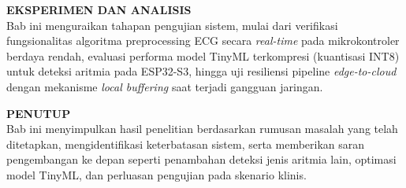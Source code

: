 \noindent
\textbf{EKSPERIMEN DAN ANALISIS}\\
\hspace*{1.5cm} Bab ini menguraikan tahapan pengujian sistem, mulai dari verifikasi fungsionalitas algoritma preprocessing ECG secara \textit{real-time} pada mikrokontroler berdaya rendah, evaluasi performa model TinyML terkompresi (kuantisasi INT8) untuk deteksi aritmia pada ESP32-S3, hingga uji resiliensi pipeline \textit{edge-to-cloud} dengan mekanisme \textit{local buffering} saat terjadi gangguan jaringan.

\noindent
\textbf{PENUTUP}\\
\hspace*{1.5cm} Bab ini menyimpulkan hasil penelitian berdasarkan rumusan masalah yang telah ditetapkan, mengidentifikasi keterbatasan sistem, serta memberikan saran pengembangan ke depan seperti penambahan deteksi jenis aritmia lain, optimasi model TinyML, dan perluasan pengujian pada skenario klinis.

